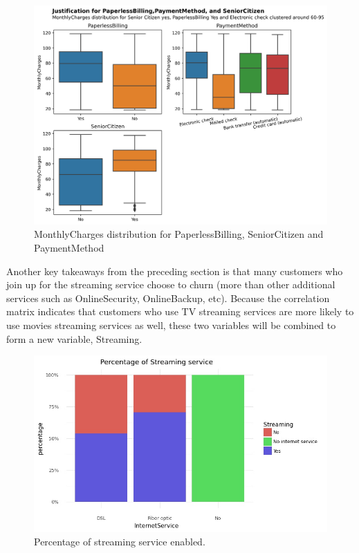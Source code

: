 \begin{figure}[!htbp]
	\centering
	\includegraphics[width=0.9\linewidth]{figures/justify_sc}
	\caption{MonthlyCharges distribution for PaperlessBilling, SeniorCitizen and PaymentMethod}
	\label{fig:justify_sc}
\end{figure}

Another key takeaways from the preceding section is that many customers who join up for the streaming service choose to churn (more than other additional services such as OnlineSecurity, OnlineBackup, etc). Because the correlation matrix indicates that customers who use TV streaming services are more likely to use movies streaming services as well, these two variables will be combined to form a new variable, Streaming.

\begin{figure}[!htbp]
	\centering
	\includegraphics[width=0.8\linewidth]{figures/percentage_streaming}
	\caption{Percentage of streaming service enabled.}
	\label{fig:percentage_streaming}
\end{figure}

